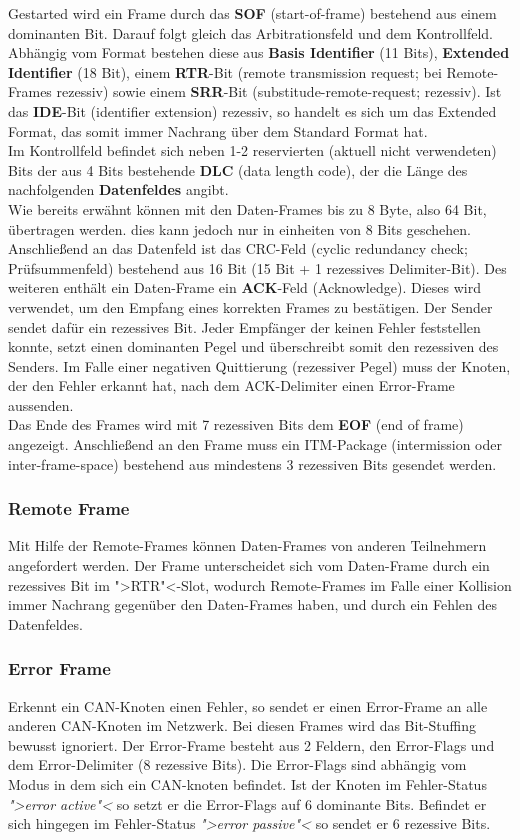 Gestarted wird ein Frame durch das \textbf{SOF} (start-of-frame)
bestehend aus einem dominanten Bit. Darauf folgt gleich das
Arbitrationsfeld und dem Kontrollfeld. Abhängig vom Format bestehen
diese aus \textbf{Basis Identifier} (11 Bits), \textbf{Extended
Identifier} (18 Bit), einem \textbf{RTR}-Bit (remote transmission
request; bei Remote-Frames rezessiv) sowie einem \textbf{SRR}-Bit
(substitude-remote-request; rezessiv). Ist das \textbf{IDE}-Bit
(identifier extension) rezessiv, so handelt es sich um das Extended
Format, das somit immer Nachrang über dem Standard Format hat.\\ Im
Kontrollfeld befindet sich neben 1-2 reservierten (aktuell nicht
verwendeten) Bits der aus 4 Bits bestehende \textbf{DLC} (data length
code), der die Länge des nachfolgenden \textbf{Datenfeldes} angibt.\\
Wie bereits erwähnt können mit den Daten-Frames bis zu 8 Byte, also 64
Bit, übertragen werden. dies kann jedoch nur in einheiten von 8 Bits
geschehen. Anschließend an das Datenfeld ist das CRC-Feld (cyclic
redundancy check; Prüfsummenfeld) bestehend aus 16 Bit (15 Bit + 1
rezessives Delimiter-Bit). Des weiteren enthält ein Daten-Frame ein
\textbf{ACK}-Feld (Acknowledge). Dieses wird verwendet, um den Empfang
eines korrekten Frames zu bestätigen. Der Sender sendet dafür ein
rezessives Bit. Jeder Empfänger der keinen Fehler feststellen konnte,
setzt einen dominanten Pegel und überschreibt somit den rezessiven des
Senders. Im Falle einer negativen Quittierung (rezessiver Pegel) muss
der Knoten, der den Fehler erkannt hat, nach dem ACK-Delimiter einen
Error-Frame aussenden.\\Das Ende des Frames wird mit 7 rezessiven Bits
dem \textbf{EOF} (end of frame) angezeigt. Anschließend an den Frame
muss ein ITM-Package (intermission oder inter-frame-space) bestehend
aus mindestens 3 rezessiven Bits gesendet werden.
	
\subsubsection{Remote Frame} Mit Hilfe der Remote-Frames können
Daten-Frames von anderen Teilnehmern angefordert werden. Der Frame
unterscheidet sich vom Daten-Frame durch ein rezessives Bit im
">RTR"<-Slot, wodurch Remote-Frames im Falle einer Kollision immer
Nachrang gegenüber den Daten-Frames haben, und durch ein Fehlen des
Datenfeldes.
	
\subsubsection{Error Frame} Erkennt ein CAN-Knoten einen Fehler, so
sendet er einen Error-Frame an alle anderen CAN-Knoten im Netzwerk.
Bei diesen Frames wird das Bit-Stuffing bewusst ignoriert. Der
Error-Frame besteht aus 2 Feldern, den Error-Flags und dem
Error-Delimiter (8 rezessive Bits). Die Error-Flags sind abhängig vom
Modus in dem sich ein CAN-knoten befindet. Ist der Knoten im
Fehler-Status \textit{">error active"<} so setzt er die Error-Flags
auf 6 dominante Bits. Befindet er sich hingegen im Fehler-Status
\textit{">error passive"<} so sendet er 6 rezessive Bits.
	
